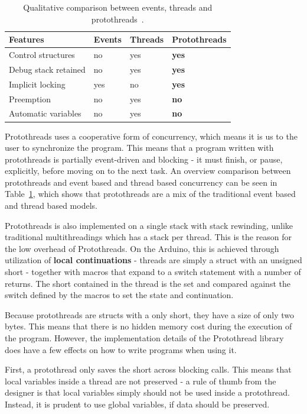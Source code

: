 \begin{table}[htb!]
  \centering
  \begin{tabular}{lll>{\bfseries}l}
    \toprule
    Features             & Events & Threads & Protothreads \\ \midrule
    Control structures   & no     & yes     & yes          \\
    Debug stack retained & no     & yes     & yes          \\
    Implicit locking     & yes    & no      & yes          \\
    Preemption           & no     & yes     & no           \\
    Automatic variables  & no     & yes     & no
  \end{tabular}
  \caption{Qualitative comparison between events, threads and protothreads~\cite{dunkels05using}.}
  \label{tab:protothreadscomparison}
\end{table}


Protothreads uses a cooperative form of concurrency, which means it is us to the user to synchronize the program. This means that a program written with protothreads is partially event-driven and blocking - it must finish, or pause, explicitly, before moving on to the next task. An overview comparison between protothreads and event based and thread based concurrency can be seen in Table~\ref{tab:protothreadscomparison}, which shows that protothreads are a mix of the traditional event based and thread based models.

Protothreads is also implemented on a single stack with stack rewinding, unlike traditional multithreadings which has a stack per thread. This is the reason for the low overhead of Protothreads. On the Arduino, this is achieved through utilization of \textbf{local continuations} - threads are simply a struct with an unsigned short - together with macros that expand to a switch statement with a number of returns. The short contained in the thread is the set and compared against the switch defined by the macros to set the state and continuation.

Because protothreads are structs with a only short, they have a size of only two bytes. This means that there is no hidden memory cost during the execution of the program. However, the implementation details of the Protothread library does have a few effects on how to write programs when using it.

First, a protothread only saves the short across blocking calls. This means that local variables inside a thread are not preserved - a rule of thumb from the designer is that local variables simply should not be used inside a protothread. Instead, it is prudent to use global variables, if data should be preserved.

